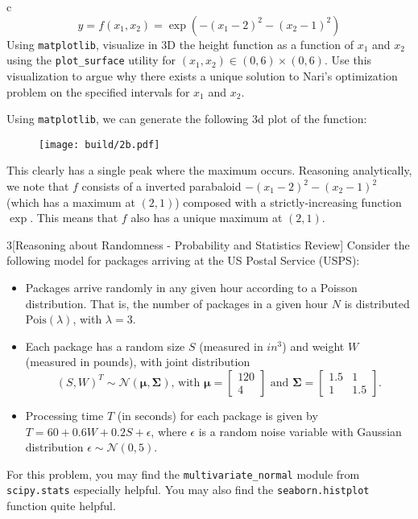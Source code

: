 \documentclass[expanded]{lkx_pset}
\begin{document}
\begin{parts}
\begin{part}{c}
    $$y = f(x_1, x_2) = \exp\left(-(x_1 - 2)^2 - (x_2 - 1)^2 \right)$$
    Using \texttt{matplotlib}, visualize in 3D the height function as a function of $x_1$ and $x_2$ using the \texttt{plot\_surface} utility for $(x_1, x_2) \in (0, 6) \times (0, 6)$. 
    Use this visualization to argue why there exists a unique solution to Nari's optimization problem on the specified intervals for $x_1$ and $x_2$.
  \end{part}

  Using \texttt{matplotlib}, we can generate the following 3d plot of the function:

  \begin{figure}[ht]
    \centering
    \texttt{[image: build/2b.pdf]}
  \end{figure}\noindent

  This clearly has a single peak where the maximum occurs. Reasoning analytically, we note that $f$ consists of a inverted parabaloid $-(x_1-2)^2 - (x_2 - 1)^2$ (which has a maximum at $(2,1)$) composed with a strictly-increasing function $\exp$. This means that $f$ also has a unique maximum at $(2, 1)$.
\end{parts}


\begin{problem}{3}[Reasoning about Randomness - Probability and Statistics Review]
Consider the following model for packages arriving at the US Postal Service (USPS):
\begin{itemize}
    \item Packages arrive randomly in any given hour according to a Poisson distribution. That is, the number of packages in a given hour $N$ is distributed $\textrm{Pois}(\lambda)$, with $\lambda = 3$.
    \item Each package has a random size $S$ (measured in $in^3$) and weight $W$ (measured in pounds), with joint distribution
    $$(S, W)^{T} \sim \mathcal{N}\left( \boldsymbol{\mu}, \boldsymbol{\Sigma}\right) \text{, with } \boldsymbol{\mu} = \begin{bmatrix} 120 \\ 4 \end{bmatrix} \text{ and } \boldsymbol{\Sigma} = \begin{bmatrix} 1.5 & 1 \\ 1 & 1.5 \end{bmatrix}.$$
    \item Processing time $T$ (in seconds) for each package is given by $T = 60 + 0.6 W + 0.2 S + \epsilon$, where $\epsilon$ is a random noise variable with Gaussian distribution $\epsilon \sim \mathcal{N}(0, 5)$.
\end{itemize}
For this problem, you may find the \texttt{multivariate\_normal} module from \texttt{scipy.stats} especially helpful. You may also find the \texttt{seaborn.histplot} function quite helpful. 
\end{problem}
\end{document}
